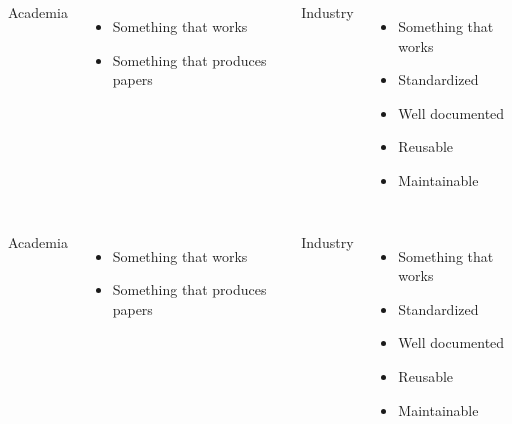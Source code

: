 \documentclass[usenames,dvipsnames]{beamer}
\theoremstyle{plain}
\theoremstyle{definition}
\begin{document}
\begin{frame}{\setframetitle{}}
  {
    \begin{columns}[t]
      \centering
      Academia
      \begin{itemize}
      \item Something that works
      \item Something that produces papers
      \end{itemize}
      \centering
      Industry
      \begin{itemize}
      \item Something that works
      \item Standardized
      \item Well documented
      \item Reusable
      \item Maintainable
      \end{itemize}
    \end{columns}
  }
  {
    \begin{columns}[t]
      \centering
      Academia
      \begin{itemize}
      \item Something that works
      \item Something that produces papers
      \end{itemize}
      \color{my_raspberry}\Rightarrow
      \centering
      Industry
      \begin{itemize}
      \item Something that works
      \item Standardized
      \item Well documented
      \item Reusable
      \item Maintainable
      \end{itemize}
    \end{columns}
    }
\end{frame}
\end{document}
